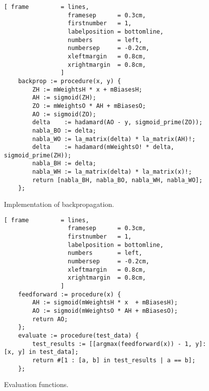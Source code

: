 \begin{figure}[!ht]
\centering
\begin{Verbatim}[ frame         = lines, 
                  framesep      = 0.3cm, 
                  firstnumber   = 1,
                  labelposition = bottomline,
                  numbers       = left,
                  numbersep     = -0.2cm,
                  xleftmargin   = 0.8cm,
                  xrightmargin  = 0.8cm,
                ]
    backprop := procedure(x, y) {
        ZH := mWeightsH * x + mBiasesH;
        AH := sigmoid(ZH);
        ZO := mWeightsO * AH + mBiasesO;
        AO := sigmoid(ZO);
        delta    := hadamard(AO - y, sigmoid_prime(ZO));
        nabla_BO := delta;
        nabla_WO := la_matrix(delta) * la_matrix(AH)!;
        delta    := hadamard(mWeightsO! * delta, sigmoid_prime(ZH));
        nabla_BH := delta;
        nabla_WH := la_matrix(delta) * la_matrix(x)!;
        return [nabla_BH, nabla_BO, nabla_WH, nabla_WO];
    };
\end{Verbatim}
\vspace*{-0.3cm}
\caption{Implementation of backpropagation.}
\label{fig:nn.stlx}
\end{figure}


\begin{figure}[!ht]
\centering
\begin{Verbatim}[ frame         = lines, 
                  framesep      = 0.3cm, 
                  firstnumber   = 1,
                  labelposition = bottomline,
                  numbers       = left,
                  numbersep     = -0.2cm,
                  xleftmargin   = 0.8cm,
                  xrightmargin  = 0.8cm,
                ]
    feedforward := procedure(x) {
        AH := sigmoid(mWeightsH * x  + mBiasesH);
        AO := sigmoid(mWeightsO * AH + mBiasesO);
        return AO;
    };
    evaluate := procedure(test_data) {
        test_results := [[argmax(feedforward(x)) - 1, y]: [x, y] in test_data];
        return #[1 : [a, b] in test_results | a == b];
    };
\end{Verbatim}
\vspace*{-0.3cm}
\caption{Evaluation functions.}
\label{fig:nn.stlx:evaluation}
\end{figure}


